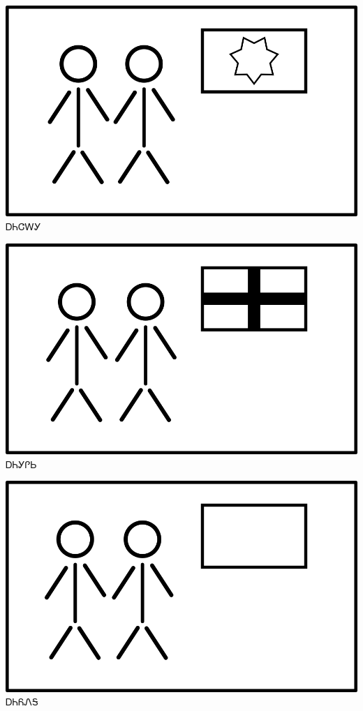 \documentclass[avery5371]{flashcards}%
\begin{document}
    \begin{flashcard}{
        \includegraphics[width=0.95\columnwidth,height=.51\columnwidth,keepaspectratio]{../artwork/flags/anijalagi-flag}
    }
        \Huge ᎠᏂᏣᎳᎩ
    \end{flashcard}

    \begin{flashcard}{
        \includegraphics[width=0.95\columnwidth,height=.51\columnwidth,keepaspectratio]{../artwork/flags/anigilisi-flag}
    }
        \Huge ᎠᏂᎩᎵᏏ
    \end{flashcard}

    \begin{flashcard}{
        \includegraphics[width=0.95\columnwidth,height=.51\columnwidth,keepaspectratio]{../artwork/flags/aniyonega-flag}
    }
        \Huge ᎠᏂᏲᏁᎦ
    \end{flashcard}
\end{document}
